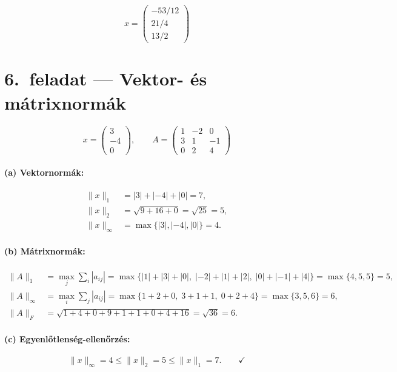 \documentclass[a4paper,12pt]{article}
\begin{document}
\[
\boxed{x = \begin{pmatrix} -53/12 \\ 21/4 \\ 13/2 \end{pmatrix}}
\]

\section*{6.\ feladat --- Vektor- és mátrixnormák}

\[
x = \begin{pmatrix} 3 \\ -4 \\ 0 \end{pmatrix}, \qquad
A = \begin{pmatrix} 1 & -2 & 0 \\ 3 & 1 & -1 \\ 0 & 2 & 4 \end{pmatrix}
\]

\paragraph{(a) Vektornormák:}
\begin{align}
\lVert x \rVert_1 &= |3| + |-4| + |0| = 7, \\
\lVert x \rVert_2 &= \sqrt{9 + 16 + 0} = \sqrt{25} = 5, \\
\lVert x \rVert_\infty &= \max\{|3|,|-4|,|0|\} = 4.
\end{align}

\paragraph{(b) Mátrixnormák:}
\begin{align}
\lVert A \rVert_1 &= \max_j \sum_{i}|a_{ij}| = \max\{|1|{+}|3|{+}|0|,\;|-2|{+}|1|{+}|2|,\;|0|{+}|-1|{+}|4|\} = \max\{4,5,5\} = 5, \\
\lVert A \rVert_\infty &= \max_i \sum_{j}|a_{ij}| = \max\{1{+}2{+}0,\;3{+}1{+}1,\;0{+}2{+}4\} = \max\{3,5,6\} = 6, \\
\lVert A \rVert_F &= \sqrt{1+4+0+9+1+1+0+4+16} = \sqrt{36} = 6.
\end{align}

\paragraph{(c) Egyenlőtlenség-ellenőrzés:}
\[
\lVert x \rVert_\infty = 4 \le \lVert x \rVert_2 = 5 \le \lVert x \rVert_1 = 7. \qquad\checkmark
\]
\end{document}
